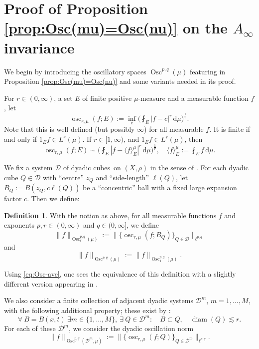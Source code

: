 \documentclass[reqno]{amsart}
\newcommand{\ud}[0]{\,\mathrm{d}}
\newcommand{\abs}[1]{|#1|}
\newcommand{\Norm}[2]{\|#1\|_{#2}}
\newcommand{\BNorm}[2]{\Big\|#1\Big\|_{#2}}
\newcommand{\ave}[1]{\langle #1\rangle}
\theoremstyle{plain}
\theoremstyle{definition}
\newtheorem{definition}[equation]{Definition}
\theoremstyle{remark}
\begin{document}
\section{Proof of Proposition \ref{prop:Osc(mu)=Osc(nu)} on the $A_\infty$ invariance}\label{sec:Ainfty}

We begin by introducing the oscillatory spaces $\operatorname{Osc}^{p,q}(\mu)$ featuring in Proposition \ref{prop:Osc(mu)=Osc(nu)} and some variants needed in its proof.

For $r\in(0,\infty)$, a set $E$ of finite positive $\mu$-measure and a measurable function $f$, let
\begin{equation*}
  \operatorname{osc}_{r,\mu}(f;E):=\inf_c\Big(\fint_E\abs{f-c}^r\ud\mu\Big)^{\frac 1r}.
\end{equation*}
Note that this is well defined (but possibly $\infty$) for all measurable $f$. It is finite if and only if $1_E f\in L^r(\mu)$. If $r\in[1,\infty)$, and $1_E f\in L^r(\mu)$, then
\begin{equation}\label{eq:Osc-ave}
  \operatorname{osc}_{r,\mu}(f;E)\sim\Big(\fint_E\abs{f-\ave{f}_E^\mu}^r\ud\mu\Big)^{\frac 1r},\quad
  \ave{f}_E^\mu:=\fint_E f\ud\mu.
\end{equation}

We fix a system $\mathscr D$ of dyadic cubes on $(X,\rho)$ in the sense of \cite{HK:12}. For each dyadic cube $Q\in\mathscr D$ with ``centre'' $z_Q$ and ``side-length'' $\ell(Q)$, let $B_Q:=B(z_Q,c\ell(Q))$ be a ``concentric'' ball with a fixed large expansion factor $c$. Then we define:

\begin{definition}\label{def:Osc-pq}
With the notion as above, for all measurable functions $f$ and exponents $p,r\in(0,\infty)$ and $q\in(0,\infty]$, we define
\begin{equation*}
  \Norm{f}{\operatorname{Osc}^{p,q}_r(\mu)}
  :=\BNorm{\Big\{\operatorname{osc}_{r,\mu}(f;B_Q)\Big\}_{Q\in\mathscr D}}{\ell^{p,q}}
\end{equation*}
and
\begin{equation*}
  \Norm{f}{\operatorname{Osc}^{p,q}(\mu)}:=\Norm{f}{\operatorname{Osc}^{p,q}_1(\mu)}.
\end{equation*}
\end{definition}

Using \eqref{eq:Osc-ave}, one sees the equivalence of this definition with a slightly different version appearing in \cite{Hyt:Sp}.

We also consider a finite collection of adjacent dyadic systems $\mathscr D^m$, $m=1,\ldots,M$, with the following additional property; these exist by \cite[Theorem 4.1]{HK:12}:
\begin{equation}\label{eq:adjacent}
  \forall\ B=B(x,t)\ \exists m\in\{1,\ldots,M\},\ \exists\ Q\in\mathscr D^m:\quad
  B\subset Q,\quad\operatorname{diam}(Q)\lesssim r.
\end{equation}
For each of these $\mathscr D^m$, we consider the dyadic oscillation norm
\begin{equation*}
  \Norm{f}{\operatorname{Osc}^{p,q}_r(\mathscr D^m,\mu)}
  :=\BNorm{\Big\{\operatorname{osc}_{r,\mu}(f;Q)\Big\}_{Q\in\mathscr D^m}}{\ell^{p,q}}.
\end{equation*}
\end{document}
